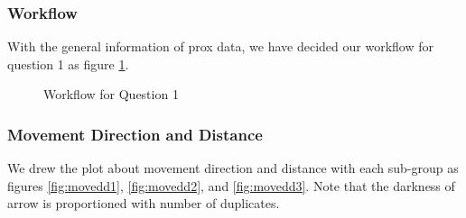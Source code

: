 \documentclass[aps, 10pt, a4paper]{article}
\begin{document}
            \subsubsection{Workflow}
                With the general information of prox data, we have decided our workflow for question 1 as figure \ref{fig:workflow1}.
                
                \begin{figure}[htbp]
                    \centering
                    \caption{Workflow for Question 1}
                    \label{fig:workflow1}
                \end{figure}
        
            \subsubsection{Movement Direction and Distance}
                We drew the plot about movement direction and distance with each sub-group as figures \ref{fig:movedd1}, \ref{fig:movedd2}, and \ref{fig:movedd3}. Note that the darkness of arrow is proportioned with number of duplicates. 
            
\end{document}
